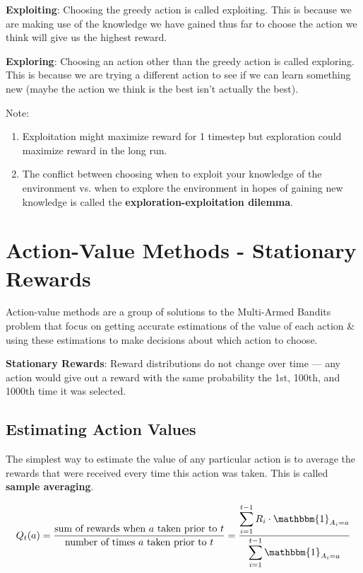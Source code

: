 \textbf{Exploiting}: Choosing the greedy action is called exploiting. This is because we are making use of the knowledge we have gained thus far to choose the action we think will give us the highest reward.

\textbf{Exploring}: Choosing an action other than the greedy action is called exploring. This is because we are trying a different action to see if we can learn something new (maybe the action we think is the best isn’t actually the best).

Note:
\begin{enumerate}
    \item Exploitation might maximize reward for 1 timestep but exploration could maximize reward in the long run.
    \item The conflict between choosing when to exploit your knowledge of the environment vs. when to explore the environment in hopes of gaining new knowledge is called the \textbf{exploration-exploitation dilemma}.
\end{enumerate}


\section{Action-Value Methods - Stationary Rewards \cite{medium-numsmt2-rl-ch2-part-2}}\label{Action-Value Methods - Stationary Rewards}
Action-value methods are a group of solutions to the Multi-Armed Bandits problem that focus on getting accurate estimations of the value of each action \& using these estimations to make decisions about which action to choose.

\textbf{Stationary Rewards}: Reward distributions do not change over time — any action would give out a reward with the same probability the 1st, 100th, and 1000th time it was selected.

\subsection{Estimating Action Values}
The simplest way to estimate the value of any particular action is to average the rewards that were received every time this action was taken. This is called \textbf{sample averaging}.

\[
    Q_t(a) = \displaystyle\dfrac{\text{sum of rewards when $a$ taken prior to $t$}}{\text{number of times $a$ taken prior to $t$}} = \displaystyle\dfrac{\dsum_{i=1}^{t-1} R_i \cdot \mathbbm{1}_{A_i = a}}{\dsum_{i=1}^{t-1} \mathbbm{1}_{A_i = a}}
\]

